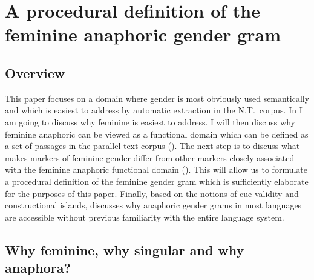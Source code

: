 \documentclass[output=collectionpaper]{langsci/langscibook}
\begin{document}
\section{A procedural definition of the feminine anaphoric gender gram}
\label{sec:BW:2}

\subsection{Overview}
\label{sec:BW:2.1}

This paper focuses on a domain where gender is most obviously used semantically and which is easiest to address by automatic extraction in the N.T.\ corpus. In  I am going to discuss why feminine is easiest to address. I will then discuss why feminine anaphoric can be viewed as a functional domain which can be defined as a set of passages in the parallel text corpus (). The next step is to discuss what makes markers of feminine gender differ from other markers closely associated with the feminine anaphoric functional domain (). This will allow us to formulate a procedural definition of the feminine gender gram which is sufficiently elaborate for the purposes of this paper. Finally, based on the notions of cue validity and constructional islands,  discusses why anaphoric gender grams in most languages are accessible without previous familiarity with the entire language system.

\largerpage
\subsection{Why feminine, why singular and why anaphora?}
\label{sec:BW:2.2}
\end{document}
